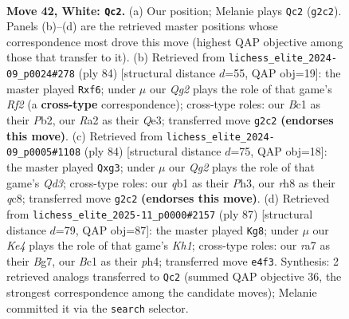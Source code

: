 \documentclass[11pt]{article}
\begin{document}
\clearpage

\begin{figure}[p]\centering
\begin{subfigure}{0.46\textwidth}\centering
\resizebox{\linewidth}{!}{%
\newchessgame
\chessboard[
  setfen={7r/r3k3/1pp3p1/4p1p1/Pp1PK3/4P3/R5Q1/1qB5 w - - 4 42},
  showmover=false,
  pgfstyle=straightmove, color=movearrow, markmove={g2-c2}
]}
\caption{}
\end{subfigure}\hfill
\begin{subfigure}{0.46\textwidth}\centering
\resizebox{\linewidth}{!}{%
\newchessgame
\chessboard[
  setfen={1r4k1/2q5/4pp2/2p1P1p1/p5P1/4Q2P/1P3R1K/8 w - - 0 43},
  showmover=false,
  pgfstyle=straightmove, color=movearrow, markmove={f2-f6}
]}
\caption{}
\end{subfigure}
\\[4pt]
\begin{subfigure}{0.46\textwidth}\centering
\resizebox{\linewidth}{!}{%
\newchessgame
\chessboard[
  setfen={2q3k1/5p2/6p1/3P4/1pP2r2/3Q2pP/1P1R1P2/5K2 w - - 0 43},
  showmover=false,
  pgfstyle=straightmove, color=movearrow, markmove={d3-g3}
]}
\caption{}
\end{subfigure}\hfill
\begin{subfigure}{0.46\textwidth}\centering
\resizebox{\linewidth}{!}{%
\newchessgame
\chessboard[
  setfen={7k/6b1/2p5/3p3Q/3P3P/pr1PP3/2q2P2/KR6 b - - 6 44},
  showmover=false,
  pgfstyle=straightmove, color=movearrow, markmove={h8-g8}
]}
\caption{}
\end{subfigure}
\caption{\textbf{Move 42, White: \texttt{Qc2}.} (a) Our position; Melanie plays \texttt{Qc2} (\texttt{g2c2}). Panels (b)--(d) are the retrieved master positions whose correspondence most drove this move (highest QAP objective among those that transfer to it). (b) Retrieved from \texttt{lichess\_elite\_2024-09\_p0024\#278} (ply 84) [structural distance $d$=55, QAP obj=19]: the master played \texttt{Rxf6}; under $\mu$ our \emph{Qg2} plays the role of that game's \emph{Rf2} (a \textbf{cross-type} correspondence); cross-type roles: our \emph{B}c1 as their \emph{P}b2, our \emph{R}a2 as their \emph{Q}e3; transferred move \texttt{g2c2} \textbf{(endorses this move)}. (c) Retrieved from \texttt{lichess\_elite\_2024-09\_p0005\#1108} (ply 84) [structural distance $d$=75, QAP obj=18]: the master played \texttt{Qxg3}; under $\mu$ our \emph{Qg2} plays the role of that game's \emph{Qd3}; cross-type roles: our \emph{q}b1 as their \emph{P}h3, our \emph{r}h8 as their \emph{q}c8; transferred move \texttt{g2c2} \textbf{(endorses this move)}. (d) Retrieved from \texttt{lichess\_elite\_2025-11\_p0000\#2157} (ply 87) [structural distance $d$=79, QAP obj=87]: the master played \texttt{Kg8}; under $\mu$ our \emph{Ke4} plays the role of that game's \emph{Kh1}; cross-type roles: our \emph{r}a7 as their \emph{B}g7, our \emph{B}c1 as their \emph{p}h4; transferred move \texttt{e4f3}. Synthesis: 2 retrieved analogs transferred to \texttt{Qc2} (summed QAP objective 36, the strongest correspondence among the candidate moves); Melanie committed it via the \texttt{search} selector.}
\label{fig:thought-m82}
\end{figure}
\end{document}
